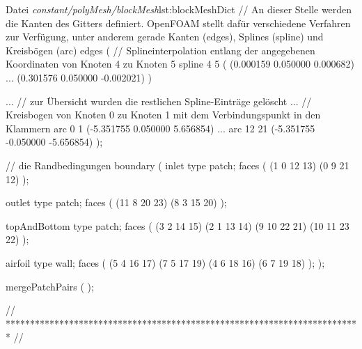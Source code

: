 \begin{dict}{Datei \textit{constant/polyMesh/blockMesh}}{lst:blockMeshDict}
// An dieser Stelle werden die Kanten des Gitters definiert. OpenFOAM stellt dafür verschiedene Verfahren zur Verfügung, unter anderem gerade Kanten (edges), Splines (spline) und Kreisbögen (arc)
edges 
( 
// Splineinterpolation entlang der angegebenen Koordinaten von Knoten 4 zu Knoten 5
    spline 4 5 
        ( 
            (0.000159 0.050000 0.000682) 
... 
            (0.301576 0.050000 -0.002021) 
        ) 
    
...
// zur Übersicht wurden die restlichen Spline-Einträge gelöscht
...        
// Kreisbogen von Knoten 0 zu Knoten 1 mit dem Verbindungspunkt in den Klammern
    arc 0 1 (-5.351755 0.050000 5.656854) 
...
    arc 12 21 (-5.351755 -0.050000 -5.656854) 
); 

// die Randbedingungen
boundary 
( 
    inlet 
    { 
        type patch; 
        faces 
        ( 
            (1 0 12 13) 
            (0 9 21 12) 
        ); 
    } 

    outlet 
    { 
        type patch; 
        faces 
        ( 
            (11 8 20 23) 
            (8 3 15 20) 
        ); 
    } 

    topAndBottom 
    { 
        type patch; 
        faces 
        ( 
            (3 2 14 15) 
            (2 1 13 14) 
            (9 10 22 21) 
            (10 11 23 22) 
        ); 
    } 

    airfoil 
    { 
        type wall; 
        faces 
        ( 
            (5 4 16 17) 
            (7 5 17 19) 
            (4 6 18 16) 
            (6 7 19 18) 
        ); 
    } 
); 
 
mergePatchPairs 
( 
); 
 
// ************************************************************************* // 


\end{dict}

\newpage